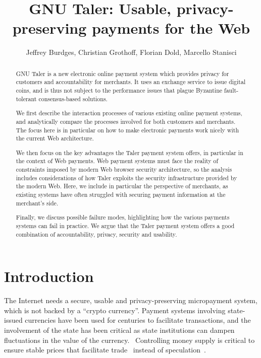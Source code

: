 \documentclass{llncs}
\date{}
\begin{document}
\title{GNU Taler: Usable, privacy-preserving payments for the Web}


\author{Jeffrey Burdges,
Christian Grothoff,
Florian Dold,
Marcello Stanisci}

\maketitle




\begin{abstract}
GNU Taler is a new electronic online payment system which provides
privacy for customers and accountability for merchants. It uses an
exchange service to issue digital coins, and is thus not subject to
the performance issues that plague Byzantine fault-tolerant
consensus-based solutions.

We first describe the interaction processes of various existing online
payment systems, and analytically compare the processes involved for
both customers and merchants.  The focus here is in particular on how
to make electronic payments work nicely with the current Web
architecture.

We then focus on the key advantages the Taler payment system offers,
in particular in the context of Web payments.  Web payment systems
must face the reality of constraints imposed by modern Web browser
security architecture, so the analysis includes considerations of how
Taler exploits the security infrastructure provided by the modern Web.
Here, we include in particular the perspective of merchants, as
existing systems have often struggled with securing payment information
at the merchant's side.

Finally, we discuss possible failure modes, highlighting how the
various payments systems can fail in practice.  We argue that the
Taler payment system offers a good combination of accountability,
privacy, security and usability.
\end{abstract}

\section{Introduction}

The Internet needs a secure, usable and privacy-preserving
micropayment system, which is not backed by a ``crypto currency''.
Payment systems involving state-issued currencies have been used for
centuries to facilitate transactions, and the involvement of the state
has been critical as state institutions can dampen fluctuations in the
value of the currency.~\cite{dominguez1993} Controlling money supply
is critical to ensure stable prices that facilitate
trade~\cite{quantitytheory1997volckart} instead of speculation~\cite{lewis_btc_is_junk}.
\end{document}

